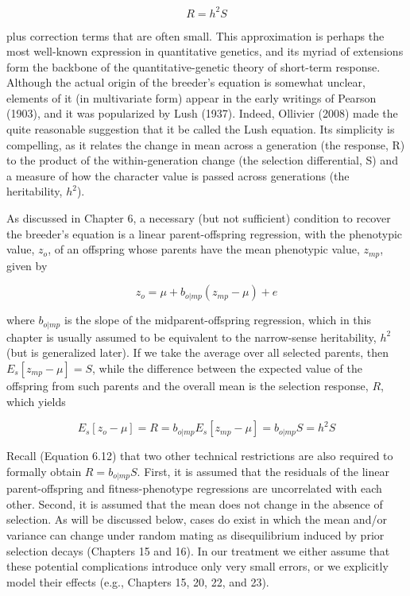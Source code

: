\documentclass{article}
\begin{document}
\begin{equation}
R=h^{2}S
\tag{13.1}
\label{eq:13_1}
\end{equation}

plus correction terms that are often small. This approximation is perhaps the most well-known expression in quantitative genetics, and its myriad of extensions form the backbone of the quantitative-genetic theory of short-term response. Although the actual origin of the breeder's equation is somewhat unclear, elements of it (in multivariate form) appear in the early writings of Pearson (1903), and it was popularized by Lush (1937). Indeed, Ollivier (2008) made the quite reasonable suggestion that it be called the Lush equation. Its simplicity is compelling, as it relates the change in mean across a generation (the response, R) to the product of the within-generation change (the selection differential, S) and a measure of how the character value is passed across generations (the heritability,  $ h^{2} $).

As discussed in Chapter 6, a necessary (but not sufficient) condition to recover the breeder's equation is a linear parent-offspring regression, with the phenotypic value,  $ z_{o} $, of an offspring whose parents have the mean phenotypic value,  $ z_{mp} $, given by

\begin{equation}
z_{o}=\mu+b_{o|m p}(z_{m p}-\mu)+e
\end{equation}

where  $ b_{o|mp} $ is the slope of the midparent-offspring regression, which in this chapter is usually assumed to be equivalent to the narrow-sense heritability,  $ h^2 $ (but is generalized later). If we take the average over all selected parents, then  $ E_s[z_{mp} - \mu] = S $, while the difference between the expected value of the offspring from such parents and the overall mean is the selection response,  $ R $, which yields

\begin{equation}
E_{s}[z_{o}-\mu]=R=b_{o|m p}E_{s}[z_{m p}-\mu]=b_{o|m p}S=h^{2}S
\end{equation}

Recall (Equation 6.12) that two other technical restrictions are also required to formally obtain  $ R = b_{o|mp} S $. First, it is assumed that the residuals of the linear parent-offspring and fitness-phenotype regressions are uncorrelated with each other. Second, it is assumed that the mean does not change in the absence of selection. As will be discussed below, cases do exist in which the mean and/or variance can change under random mating as disequilibrium induced by prior selection decays (Chapters 15 and 16). In our treatment we either assume that these potential complications introduce only very small errors, or we explicitly model their effects (e.g., Chapters 15, 20, 22, and 23).
\end{document}
